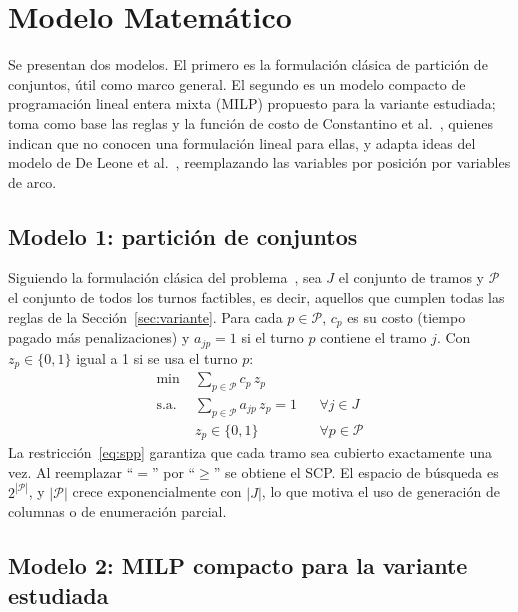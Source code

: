 \documentclass[letter, 10pt]{article}
\begin{document}
\section{Modelo Matem\'atico}\label{sec:modelo}
Se presentan dos modelos. El primero es la formulación clásica de partición de conjuntos, útil como marco general. El segundo es un modelo compacto de programación lineal entera mixta (MILP) propuesto para la variante estudiada; toma como base las reglas y la función de costo de Constantino et al.~\cite{Constantino2017}, quienes indican que no conocen una formulación lineal para ellas, y adapta ideas del modelo de De Leone et al.~\cite{DeLeone2011a}, reemplazando las variables por posición por variables de arco.

\subsection{Modelo 1: partición de conjuntos}
Siguiendo la formulación clásica del problema~\cite{Portugal2009,DeLeone2011a}, sea $J$ el conjunto de tramos y $\mathcal{P}$ el conjunto de todos los turnos factibles, es decir, aquellos que cumplen todas las reglas de la Sección~\ref{sec:variante}. Para cada $p\in\mathcal{P}$, $c_p$ es su costo (tiempo pagado más penalizaciones) y $a_{jp}=1$ si el turno $p$ contiene el tramo $j$. Con $z_p\in\{0,1\}$ igual a 1 si se usa el turno $p$:
\begin{align}
\min \; & \sum_{p\in\mathcal{P}} c_p\, z_p \\
\text{s.a.}\; & \sum_{p\in\mathcal{P}} a_{jp}\, z_p = 1 && \forall j\in J \label{eq:spp}\\
& z_p\in\{0,1\} && \forall p\in\mathcal{P}
\end{align}
La restricción~\eqref{eq:spp} garantiza que cada tramo sea cubierto exactamente una vez. Al reemplazar ``$=$'' por ``$\geq$'' se obtiene el SCP. El espacio de búsqueda es $2^{|\mathcal{P}|}$, y $|\mathcal{P}|$ crece exponencialmente con $|J|$, lo que motiva el uso de generación de columnas o de enumeración parcial.

\subsection{Modelo 2: MILP compacto para la variante estudiada}
\end{document}
